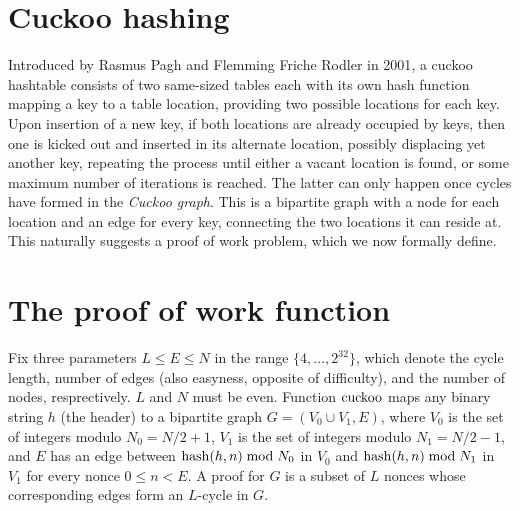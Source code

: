 \documentclass[11pt, oneside]{article}
\newcommand{\cuckoo}{{\rm cuckoo}}
\newcommand{\hash}{{\rm hash}}
\begin{document}
\section{Cuckoo hashing}
Introduced by Rasmus Pagh and Flemming Friche Rodler in
2001\cite{Pagh01cuckoohashing}, a cuckoo hashtable consists of two same-sized
tables each with its own hash function mapping a key to a table location,
providing two possible locations for each key.
Upon insertion of a new key, if both locations are already occupied by keys,
then one is kicked out and inserted in its alternate location, possibly
displacing yet another key, repeating the process until either a vacant
location is found, or some maximum number of iterations is reached.
The latter can only happen once cycles have formed in the {\em Cuckoo graph}.
This is a bipartite graph with a node for each location and an
edge for every key, connecting the two locations it can reside at.
This naturally suggests a proof of work problem, which we now formally define.

\section{The proof of work function}
Fix three parameters $L \leq E \leq N$ in the range $\{4,...,2^{32}\}$, which
denote the cycle length, number of edges (also easyness, opposite of difficulty),
and the number of nodes, resprectively. $L$ and $N$ must be even.
Function $\cuckoo$ maps any binary string $h$ (the header) to a bipartite graph
$G = (V_0 \cup V_1, E)$, where $V_0$ is the set of integers modulo $N_0=N/2+1$,
$V_1$ is the set of integers modulo $N_1=N/2-1$, and $E$ has an edge between
$\hash(h,n) \bmod N_0$ in $V_0$ and $\hash(h,n) \bmod N_1$ in $V_1$ for every
nonce $0 \leq n < E$. A proof for $G$ is a subset of $L$ nonces whose
corresponding edges form an $L$-cycle in $G$.
\end{document}
